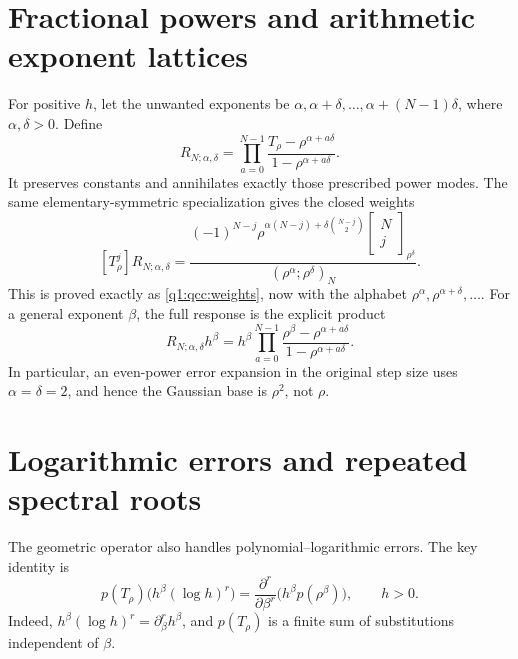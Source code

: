 \documentclass[11pt,a4paper,oneside,openany]{book}
\theoremstyle{definition}
\theoremstyle{remark}
\newcommand{\GB}[3][q]{\begin{bmatrix}#2\\#3\end{bmatrix}_{#1}}
\begin{document}
\section{Fractional powers and arithmetic exponent lattices}
For positive \(h\), let the unwanted exponents be
\(\alpha,\alpha+\delta,\ldots,\alpha+(N-1)\delta\), where
\(\alpha,\delta>0\). Define
\begin{equation}\label{q1:qcc:general-filter}
 R_{N;\alpha,\delta}
 =\prod_{a=0}^{N-1}
       \frac{T_\rho-\rho^{\alpha+a\delta}}
            {1-\rho^{\alpha+a\delta}}.
\end{equation}
It preserves constants and annihilates exactly those prescribed power modes.
The same elementary-symmetric specialization gives the closed weights
\begin{equation}\label{q1:qcc:general-weights}
 [T_\rho^j]R_{N;\alpha,\delta}
 =\frac{(-1)^{N-j}
        \rho^{\alpha(N-j)+\delta\binom{N-j}{2}}
        \GB[\rho^\delta]Nj}
       {(\rho^\alpha;\rho^\delta)_N}.
\end{equation}
This is proved exactly as \eqref{q1:qcc:weights}, now with the alphabet
\(\rho^\alpha,\rho^{\alpha+\delta},\ldots\). For a general exponent
\(\beta\), the full response is the explicit product
\[
 R_{N;\alpha,\delta}h^\beta
  =h^\beta\prod_{a=0}^{N-1}
      \frac{\rho^\beta-\rho^{\alpha+a\delta}}
           {1-\rho^{\alpha+a\delta}}.
\]
In particular, an even-power error expansion in the original step size uses
\(\alpha=\delta=2\), and hence the Gaussian base is \(\rho^2\),
not \(\rho\).

\section{Logarithmic errors and repeated spectral roots}
The geometric operator also handles polynomial--logarithmic errors. The key
identity is
\begin{equation}\label{q1:qcc:log-spectral-identity}
 p(T_\rho)\bigl(h^\beta(\log h)^r\bigr)
  =\frac{\partial^r}{\partial\beta^r}
            \bigl(h^\beta p(\rho^\beta)\bigr),\qquad h>0.
\end{equation}
Indeed, \(h^\beta(\log h)^r=\partial_\beta^rh^\beta\), and
\(p(T_\rho)\) is a finite sum of substitutions independent of \(\beta\).
\end{document}
